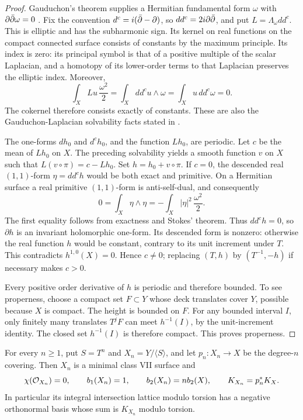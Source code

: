 \begin{proof}
Gauduchon's theorem supplies a Hermitian fundamental form $\omega$ with
$\partial\bar\partial\omega=0$ \cite{Gauduchon1977}. Fix the convention
$d^c=i(\bar\partial-\partial)$, so $dd^c=2i\partial\bar\partial$, and put
$L=\Lambda_\omega dd^c$. This is elliptic and has the subharmonic sign.
Its kernel on real functions on the compact connected surface consists
of constants by the maximum principle. Its index is zero: its principal
symbol is that of a positive multiple of the scalar Laplacian, and a
homotopy of its lower-order terms to that Laplacian preserves the elliptic
index. Moreover,
\[
 \int_X Lu\,\frac{\omega^2}{2}
 =\int_X dd^c u\wedge\omega
 =\int_X u\,dd^c\omega=0.
\]
The cokernel therefore consists exactly of constants. These are also the
Gauduchon-Laplacian solvability facts stated in
\cite[p.~289]{Buchdahl1999}.

The one-forms $dh_0$ and $d^ch_0$, and the function $Lh_0$, are periodic.
Let $c$ be the mean of $Lh_0$ on $X$. The preceding solvability yields a
smooth function $v$ on $X$ such that
$L(v\circ\pi)=c-Lh_0$. Set $h=h_0+v\circ\pi$.
If $c=0$, the descended real $(1,1)$-form $\eta=dd^ch$ would be both
exact and primitive. On a Hermitian surface a real primitive $(1,1)$-form
is anti-self-dual, and consequently
\[
 0=\int_X\eta\wedge\eta
   =-\int_X|\eta|^2\,\frac{\omega^2}{2}.
\]
The first equality follows from exactness and Stokes' theorem. Thus
$dd^ch=0$, so $\partial h$ is an invariant holomorphic one-form.
Its descended form is nonzero: otherwise the real function $h$ would be
constant, contrary to its unit increment under $T$. This contradicts
$h^{1,0}(X)=0$. Hence $c\neq0$; replacing $(T,h)$ by $(T^{-1},-h)$ if
necessary makes $c>0$.

Every positive order derivative of $h$ is periodic and therefore bounded.
To see properness, choose a compact set $F\subset Y$ whose deck translates
cover $Y$, possible because $X$ is compact. The height is bounded on $F$.
For any bounded interval $I$, only finitely many translates $T^jF$ can
meet $h^{-1}(I)$, by the unit-increment identity. The closed set
$h^{-1}(I)$ is therefore compact. This proves properness.
\end{proof}

\begin{lemma}\label{surface:covers}
For every $n\geq1$, put $S=T^n$ and $X_n=Y/\langle S\rangle$, and let
$p_n:X_n\to X$ be the degree-$n$ covering. Then $X_n$ is a minimal class
VII surface and
\[
 \chi(\mathcal O_{X_n})=0,\qquad b_1(X_n)=1,\qquad
 b_2(X_n)=n b_2(X),\qquad K_{X_n}=p_n^*K_X.
\]
In particular its integral intersection lattice modulo torsion has a
negative orthonormal basis whose sum is $K_{X_n}$ modulo torsion.
\end{lemma}

